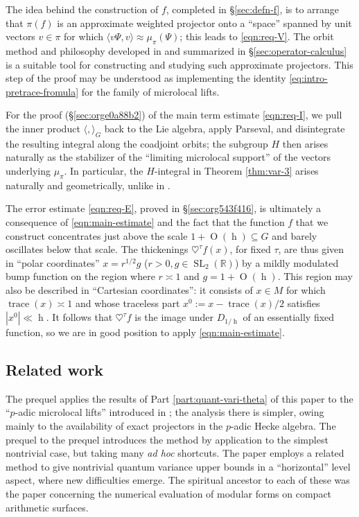 \documentclass[reqno,10pt]{amsart}
\theoremstyle{plain} %
\theoremstyle{definition}
\theoremstyle{plain} %
\theoremstyle{remark}
\theoremstyle{itplain} %
\theoremstyle{remark} %
\numberwithin{equation}{section}
\DeclareMathOperator{\SL}{SL}
\DeclareMathOperator{\trace}{trace}
\def\O{\operatorname{O}}
\DeclareMathOperator{\h}{h}
\begin{document}
The idea behind the construction of $f$, completed in \S\ref{sec:defn-f}, is to arrange that $\pi(f)$ is an approximate weighted projector onto a ``space'' spanned by unit vectors $v \in \pi$ for which $\langle v \Psi, v \rangle \approx \mu_\pi(\Psi)$; this leads to \eqref{eqn:req-V}.  The orbit method and philosophy developed in \cite{nelson-venkatesh-1} and summarized in \S\ref{sec:operator-calculus} is a suitable tool for constructing and studying such approximate projectors.  This step of the proof may be understood as implementing the identity \eqref{eq:intro-pretrace-fromula} for the family of microlocal lifts.



For the proof (\S\ref{sec:orge0a88b2}) of the main term estimate \eqref{eqn:req-I}, we pull the inner product $\langle , \rangle_G$ back to the Lie algebra, apply Parseval, and disintegrate the resulting integral along the coadjoint orbits; the subgroup $H$ then arises naturally as the stabilizer of the ``limiting microlocal support'' of the vectors underlying $\mu_\pi$.  In particular, the $H$-integral in Theorem \ref{thm:var-3} arises naturally and geometrically, unlike in \cite{2013arXiv1303.6972S}.


The error estimate \eqref{eqn:req-E}, proved in \S\ref{sec:org543f416}, is ultimately a consequence of \eqref{eqn:main-estimate} and the fact that the function $f$ that we construct concentrates just above the scale $1 + \O(\h) \subseteq G$ and barely oscillates below that scale.  The thickenings $\heartsuit^{\tau} f(x)$, for fixed $\tau$, are thus given in ``polar coordinates'' $x = r^{1/2} g$ ($r > 0, g \in \SL_2(\mathbb{R})$) by a mildly modulated bump function on the region where $r \asymp 1$ and $g = 1 + \O(\h)$.  This region may also be described in ``Cartesian coordinates'': it consists of $x \in M$ for which $\trace(x) \asymp 1$ and whose traceless part $x^0 := x - \trace(x)/2$ satisfies $|x^0| \ll \h$.  It follows that $\heartsuit^{\tau} f$ is the image under $D_{1/\h}$ of an essentially fixed function, so we are in good position to apply \eqref{eqn:main-estimate}.





\subsection{Related work}\label{sec:35ac3e56ab}
The prequel \cite{nelson-variance-II} applies the results of Part \ref{part:quant-vari-theta} of this paper to the ``$p$-adic microlocal lifts'' introduced in \cite{nelson-padic-que}; the analysis there is simpler, owing mainly to the availability of exact projectors in the $p$-adic Hecke algebra.  The prequel to the prequel \cite{nelson-variance-73-2} introduces the method by application to the simplest nontrivial case, but taking many \emph{ad hoc} shortcuts.  The paper \cite{Nelson-TwistedSym2} employs a related method to give nontrivial quantum variance upper bounds in a ``horizontal'' level aspect, where new difficulties emerge.  The spiritual ancestor to each of these was the paper \cite{2012arXiv1210.1243N} concerning the numerical evaluation of modular forms on compact arithmetic surfaces.
\end{document}
